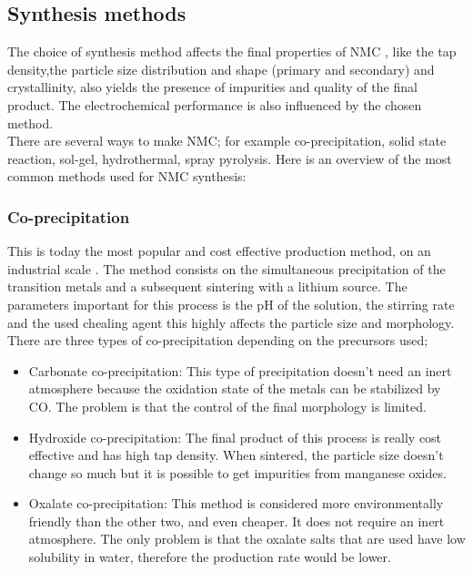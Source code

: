 \documentclass{article}
\begin{document}
\subsection{Synthesis methods}
The choice of synthesis method  affects the final properties of NMC
, like the tap density,the particle size distribution and  shape (primary and secondary) and 
crystallinity, also yields the presence of impurities and quality of the final product.
The electrochemical performance is also influenced by the chosen method.\\
There are several ways to make NMC; for example co-precipitation, solid state reaction, sol-gel, hydrothermal, spray pyrolysis\cite{process}.
Here is an overview of the most common methods used for NMC synthesis:\\
\subsubsection{Co-precipitation}
This is today the most popular and cost effective production method, on an industrial scale
. The method consists on the simultaneous precipitation of the transition metals and a subsequent sintering with
a lithium source. The parameters important for this process is the pH of the solution, the stirring rate 
and the used chealing agent this highly affects the particle size and morphology\cite{process}.\\
There are three types of co-precipitation depending on the precursors used;
\begin{itemize}
  \item Carbonate co-precipitation: This type of precipitation doesn't need an inert atmosphere
  because the oxidation state of the metals can be stabilized by CO. The problem is that
the control of the final morphology is limited.
  \item Hydroxide co-precipitation: The final product of this process is really
  cost effective and has high tap density. When sintered, the particle size doesn't change
  so much but it is possible to get impurities from manganese oxides.
  \item Oxalate co-precipitation: This method is considered more environmentally
  friendly than the other two, and even cheaper. It does not require an inert 
  atmosphere. The only problem is that the oxalate salts that are used 
  have low solubility in water, therefore the production rate would be lower\cite{process}.
\end{itemize}
\end{document}

